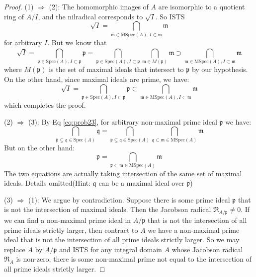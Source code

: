 \documentclass{solution}
\begin{document}
\begin{proof}
    (1) $\Rightarrow$ (2): The homomorphic images of $A$ are isomorphic to a quotient ring of $A / I$, and the nilradical corresponds to $\sqrt{I}$. So ISTS
    \begin{equation}\label{eq:prob23}
        \sqrt{I} = \bigcap\limits_{\mathfrak{m} \in \mathrm{MSpec}(A), I \subset \mathfrak{m}} \mathfrak{m}
    \end{equation}
    for arbitrary $I$. But we know that
    $$\sqrt{I} = \bigcap\limits_{\mathfrak{p} \in \mathrm{Spec}(A), I \subset \mathfrak{p}} \mathfrak{p} = \bigcap\limits_{\mathfrak{p} \in \mathrm{Spec}(A), I \subset \mathfrak{p}} \bigcap\limits_{\mathfrak{m} \in M(\mathfrak{p})}^{}\mathfrak{m} \supset \bigcap\limits_{\mathfrak{m} \in \mathrm{MSpec}(A), I \subset \mathfrak{m}} \mathfrak{m}$$
    where $M(\mathfrak{p})$ is the set of maximal ideals that intersect to $\mathfrak{p}$ by our hypothesis. On the other hand, since maximal ideals are prime, we have:
    $$\sqrt{I} = \bigcap\limits_{\mathfrak{p} \in \mathrm{Spec}(A), I \subset \mathfrak{p}} \mathfrak{p} \subset \bigcap\limits_{\mathfrak{m} \in \mathrm{MSpec}(A), I \subset \mathfrak{m}} \mathfrak{m}$$
    which completes the proof.
    
    (2) $\Rightarrow$ (3): By Eq \ref{eq:prob23}, for arbitrary non-maximal prime ideal $\mathfrak{p}$ we have:
    $$\bigcap\limits_{\mathfrak{p} \subsetneq \mathfrak{q} \in \mathrm{Spec}(A)} \mathfrak{q} = \bigcap\limits_{\mathfrak{p} \subsetneq \mathfrak{q} \in \mathrm{Spec}(A)} \bigcap\limits_{\mathfrak{q} \subset \mathfrak{m} \in \mathrm{MSpec}(A)} \mathfrak{m}$$
    But on the other hand:
    $$\mathfrak{p} = \bigcap\limits_{\mathfrak{p} \subset \mathfrak{m} \in \mathrm{MSpec}(A)} \mathfrak{m}$$
    The two equations are actually taking intersection of the same set of maximal ideals. Details omitted(Hint: $\mathfrak{q}$ can be a maximal ideal over $\mathfrak{p}$)

    (3) $\Rightarrow$ (1): We argue by contradiction. Suppose there is some prime ideal $\mathfrak{p}$ that is not the intersection of maximal ideals. Then the Jacobson radical $\mathfrak{R}_{A / \mathfrak{p}} \ne 0$. If we can find a non-maximal prime ideal in $A / \mathfrak{p}$ that is not the intersection of all prime ideals strictly larger, then contract to $A$ we have a non-maximal prime ideal that is not the intersection of all prime ideals strictly larger. So we may replace $A$ by $A / \mathfrak{p}$ and ISTS for any integral domain $A$ whose Jacobson radical $\mathfrak{R}_A$ is non-zero, there is some non-maximal prime not equal to the intersection of all prime ideals strictly larger.


\end{proof}
\end{document}
